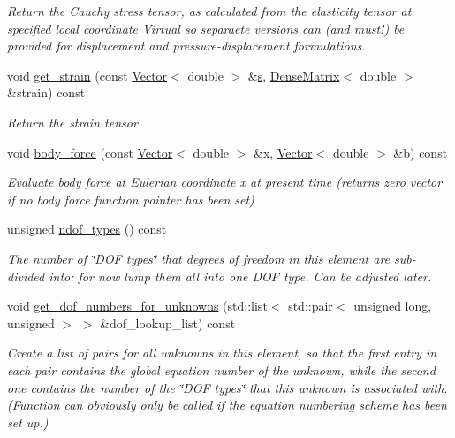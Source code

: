 \begin{DoxyCompactItemize}
\begin{DoxyCompactList}\small\item\em Return the Cauchy stress tensor, as calculated from the elasticity tensor at specified local coordinate Virtual so separaete versions can (and must!) be provided for displacement and pressure-\/displacement formulations. \end{DoxyCompactList}\item 
void \hyperlink{classoomph_1_1LinearElasticityEquationsBase_a6abe4e64b421290d95bf8e6b5c99eae7}{get\+\_\+strain} (const \hyperlink{classoomph_1_1Vector}{Vector}$<$ double $>$ \&\hyperlink{cfortran_8h_ab7123126e4885ef647dd9c6e3807a21c}{s}, \hyperlink{classoomph_1_1DenseMatrix}{Dense\+Matrix}$<$ double $>$ \&strain) const
\begin{DoxyCompactList}\small\item\em Return the strain tensor. \end{DoxyCompactList}\item 
void \hyperlink{classoomph_1_1LinearElasticityEquationsBase_a6d1d79dd1b1dcd159f573a81b6569bfa}{body\+\_\+force} (const \hyperlink{classoomph_1_1Vector}{Vector}$<$ double $>$ \&x, \hyperlink{classoomph_1_1Vector}{Vector}$<$ double $>$ \&b) const
\begin{DoxyCompactList}\small\item\em Evaluate body force at Eulerian coordinate x at present time (returns zero vector if no body force function pointer has been set) \end{DoxyCompactList}\item 
unsigned \hyperlink{classoomph_1_1LinearElasticityEquationsBase_adf786bf2d8fe20b864d7f2bf90b20242}{ndof\+\_\+types} () const
\begin{DoxyCompactList}\small\item\em The number of \char`\"{}\+D\+O\+F types\char`\"{} that degrees of freedom in this element are sub-\/divided into\+: for now lump them all into one D\+OF type. Can be adjusted later. \end{DoxyCompactList}\item 
void \hyperlink{classoomph_1_1LinearElasticityEquationsBase_add3ab9f1bbd914e5a460bfefb4eff5c9}{get\+\_\+dof\+\_\+numbers\+\_\+for\+\_\+unknowns} (std\+::list$<$ std\+::pair$<$ unsigned long, unsigned $>$ $>$ \&dof\+\_\+lookup\+\_\+list) const
\begin{DoxyCompactList}\small\item\em Create a list of pairs for all unknowns in this element, so that the first entry in each pair contains the global equation number of the unknown, while the second one contains the number of the \char`\"{}\+D\+O\+F types\char`\"{} that this unknown is associated with. (Function can obviously only be called if the equation numbering scheme has been set up.) \end{DoxyCompactList}\end{DoxyCompactItemize}
